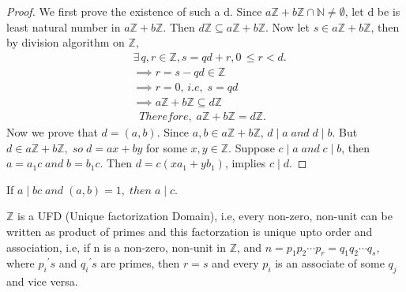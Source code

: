\documentclass[10pt,a4paper]{article}
\begin{document}
\begin{proof}
We first prove the existence of such a d. Since $a\mathbb{Z}+b\mathbb{Z} \cap \mathbb{N} \neq \emptyset$, let d be is least natural number in $a\mathbb{Z}+b\mathbb{Z}$. Then $d\mathbb{Z} \subseteq a\mathbb{Z}+b\mathbb{Z}$. Now let $s \in a\mathbb{Z}+b\mathbb{Z}$, then by division algorithm on $\mathbb{Z},$ 
\begin{align*}
&\exists \,q,r \in \mathbb{Z}, s = qd+r, 0\,\le r < d. \\
&\implies r = s-qd \in \mathbb{Z} \\
&\implies r = 0,\, i.e,\; s = qd \\
&\implies a\mathbb{Z}+b\mathbb{Z} \subseteq d\mathbb{Z} \\
& \;\;Therefore,\; a\mathbb{Z}+b\mathbb{Z} = d\mathbb{Z}.
\end{align*}
Now we prove that $d  = (a,b)$. Since $a,b \in a\mathbb{Z}+b\mathbb{Z},\, d\mid a \;and\; d\mid b$. But $d \in a\mathbb{Z}+b\mathbb{Z}, \;so\; d=ax+by$ for some $x,y\in\mathbb{Z}$. Suppose $c\mid a\;and\;c\mid b$, then $a = a_{1}c \;and\; b=b_{1}c$. Then $d = c(xa_{1}+yb_{1})$, implies $c\mid d$.
\end{proof}

\begin{corollary}
If $a\mid bc\;and\;(a,b) = 1,\;then\;a\mid c$.
\end{corollary}

\begin{theorem}
$\mathbb{Z}$ is a UFD (Unique factorization Domain), i.e, every non-zero, non-unit can be written as product of primes and this factorzation is unique upto order and association, i.e, if n is a non-zero, non-unit in $\mathbb{Z}$, and $n = p_{1}p_{2}{\cdots}p_{r} = q_{1}q_{2}{\cdots}q_{s}$, where ${p_{i}}^{\prime}s$ and ${q_{i}}^{\prime}s$ are primes, then $r=s$ and every $p_{i}$ is an associate of some $q_{j}$ and vice versa.
\end{theorem}
\end{document}

